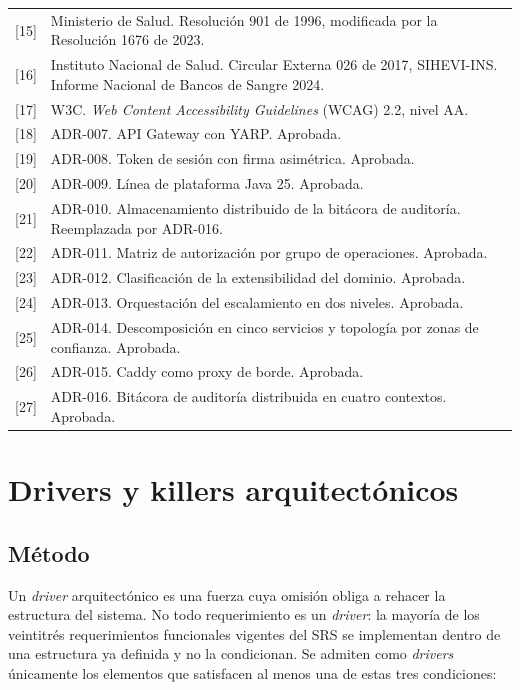 \documentclass[11pt,a4paper]{article}
\begin{document}
\begin{longtable}{L{1.2cm} L{13.4cm}}
{[15]} & Ministerio de Salud. Resolución 901 de 1996, modificada por la Resolución 1676 de 2023. \\
{[16]} & Instituto Nacional de Salud. Circular Externa 026 de 2017, SIHEVI-INS. Informe Nacional de Bancos de Sangre 2024. \\
{[17]} & W3C. \emph{Web Content Accessibility Guidelines} (WCAG) 2.2, nivel AA. \\
{[18]} & ADR-007. API Gateway con YARP. Aprobada. \\
{[19]} & ADR-008. Token de sesión con firma asimétrica. Aprobada. \\
{[20]} & ADR-009. Línea de plataforma Java 25. Aprobada. \\
{[21]} & ADR-010. Almacenamiento distribuido de la bitácora de auditoría. Reemplazada por ADR-016. \\
{[22]} & ADR-011. Matriz de autorización por grupo de operaciones. Aprobada. \\
{[23]} & ADR-012. Clasificación de la extensibilidad del dominio. Aprobada. \\
{[24]} & ADR-013. Orquestación del escalamiento en dos niveles. Aprobada. \\
{[25]} & ADR-014. Descomposición en cinco servicios y topología por zonas de confianza. Aprobada. \\
{[26]} & ADR-015. Caddy como proxy de borde. Aprobada. \\
{[27]} & ADR-016. Bitácora de auditoría distribuida en cuatro contextos. Aprobada. \\
\end{longtable}

\section{Drivers y killers arquitectónicos}
\label{sec:drivers}

\subsection{Método}

Un \emph{driver} arquitectónico es una fuerza cuya omisión obliga a rehacer la estructura del sistema. No todo requerimiento es un \emph{driver}: la mayoría de los veintitrés requerimientos funcionales vigentes del SRS se implementan dentro de una estructura ya definida y no la condicionan. Se admiten como \emph{drivers} únicamente los elementos que satisfacen al menos una de estas tres condiciones:
\end{document}
